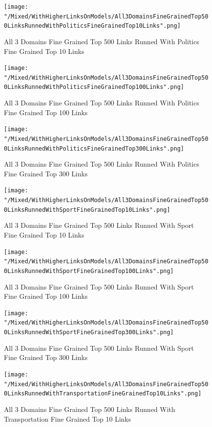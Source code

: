 \documentclass[thesis=M,english]{FITthesis}[2018/05/30]
\begin{document}
	\begin{figure}[H]\centering
		\texttt{[image: "/Mixed/WithHigherLinksOnModels/All3DomainsFineGrainedTop500LinksRunnedWithPoliticsFineGrainedTop10Links".png]}
		\caption{All 3 Domains Fine Grained Top 500 Links Runned With Politics Fine Grained Top 10 Links}\label{}
	\end{figure}
	
	\begin{figure}[H]\centering
		\texttt{[image: "/Mixed/WithHigherLinksOnModels/All3DomainsFineGrainedTop500LinksRunnedWithPoliticsFineGrainedTop100Links".png]}
		\caption{All 3 Domains Fine Grained Top 500 Links Runned With Politics Fine Grained Top 100 Links}\label{}
	\end{figure}
	
	\begin{figure}[H]\centering
		\texttt{[image: "/Mixed/WithHigherLinksOnModels/All3DomainsFineGrainedTop500LinksRunnedWithPoliticsFineGrainedTop300Links".png]}
		\caption{All 3 Domains Fine Grained Top 500 Links Runned With Politics Fine Grained Top 300 Links}\label{}
	\end{figure}
	
	\begin{figure}[H]\centering
		\texttt{[image: "/Mixed/WithHigherLinksOnModels/All3DomainsFineGrainedTop500LinksRunnedWithSportFineGrainedTop10Links".png]}
		\caption{All 3 Domains Fine Grained Top 500 Links Runned With Sport Fine Grained Top 10 Links}\label{}
	\end{figure}	
	
	\begin{figure}[H]\centering
		\texttt{[image: "/Mixed/WithHigherLinksOnModels/All3DomainsFineGrainedTop500LinksRunnedWithSportFineGrainedTop100Links".png]}
		\caption{All 3 Domains Fine Grained Top 500 Links Runned With Sport Fine Grained Top 100 Links}\label{}
	\end{figure}
	
	\begin{figure}[H]\centering
		\texttt{[image: "/Mixed/WithHigherLinksOnModels/All3DomainsFineGrainedTop500LinksRunnedWithSportFineGrainedTop300Links".png]}
		\caption{All 3 Domains Fine Grained Top 500 Links Runned With Sport Fine Grained Top 300 Links}\label{}
	\end{figure}
	
	\begin{figure}[H]\centering
		\texttt{[image: "/Mixed/WithHigherLinksOnModels/All3DomainsFineGrainedTop500LinksRunnedWithTransportationFineGrainedTop10Links".png]}
		\caption{All 3 Domains Fine Grained Top 500 Links Runned With Transportation Fine Grained Top 10 Links}\label{}
	\end{figure}	
	
\end{document}
